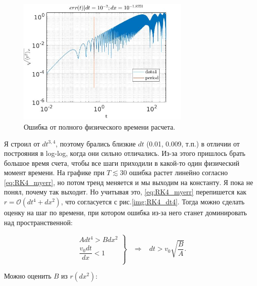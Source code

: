 \documentclass[a4paper,12pt]{article} %
\begin{document}
\begin{figure}[h!]
\begin{center}
\includegraphics[width=0.75\textwidth]{./pics/RK4_Terr}
\end{center}
\caption{Ошибка от полного физического времени расчета.} \label{img:RK4_Terr}
\end{figure}

Я строил от $dt^{3,4}$, поэтому брались близкие $dt$ (0.01, 0.009, т.п.) в отличии от построяния в log-log, когда они сильно отличались. Из-за этого пришлось брать большое время счета, чтобы все шаги приходили в какой-то один физический момент времени. На графике при $T \lesssim 30$ ошибка растет линейно согласно \eqref{eq:RK4_myerr}, но потом тренд меняется и мы выходим на константу. Я пока не понял, почему так выходит. Но учитывая это, \eqref{eq:RK4_myerr} перепишется как $r = \mathcal{O}(dt^4 + dx^2)$, что согласуется с рис.\ref{img:RK4_dt4}. Тогда можно сделать оценку на шаг по времени, при котором ошибка из-за него станет доминировать над пространственной:

\begin{equation} \label{eq:dt_est}
\left.
\begin{aligned}
& A dt^4 > B dx^2 \\
& \dfrac{v_0 dt}{dx} < 1 \\
\end{aligned}
\right\} \hspace{10pt} \Rightarrow \hspace{10pt} dt > v_0 \sqrt{\dfrac{B}{A}}.
\end{equation}

\newpage

Можно оценить $B$ из $r(dx^2)$:
\end{document}
